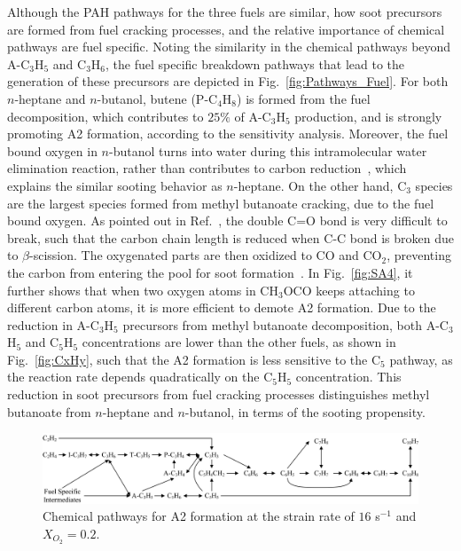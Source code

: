 \documentclass[review,3p,times]{elsarticleUS}
\begin{document}
Although the PAH pathways for the three fuels are similar, how soot precursors are formed from fuel cracking processes, and the relative importance of chemical pathways are fuel specific. Noting the similarity in the chemical pathways beyond A-C$_3$H$_5$ and C$_3$H$_6$, the fuel specific breakdown pathways that lead to the generation of these precursors are depicted in Fig.~\ref{fig:Pathways_Fuel}. For both $n$-heptane and $n$-butanol, butene (P-C$_4$H$_8$) is formed from the fuel decomposition, which contributes to $25\%$ of A-C$_3$H$_5$ production, and is strongly promoting A2 formation, according to the sensitivity analysis. Moreover, the fuel bound oxygen in $n$-butanol turns into water during this intramolecular water elimination reaction, rather than contributes to carbon reduction~\cite{mcenally05,mcenally11}, which explains the similar sooting behavior as $n$-heptane. On the other hand, C$_3$ species are the largest species formed from methyl butanoate cracking, due to the fuel bound oxygen. As pointed out in Ref.~\cite{westbrook06}, the double C=O bond is very difficult to break, such that the carbon chain length is reduced when C-C bond is broken due to $\beta$-scission. The oxygenated parts are then oxidized to CO and CO$_2$, preventing the carbon from entering the pool for soot formation~\cite{feng12,wangyl11}. In Fig.~\ref{fig:SA4}, it further shows that when two oxygen atoms in CH$_3$OCO keeps attaching to different carbon atoms, it is more efficient to demote A2 formation. Due to the reduction in A-C$_3$H$_5$ precursors from methyl butanoate decomposition, both A-C$_3$H$_5$ and C$_5$H$_5$ concentrations are lower than the other fuels, as shown in Fig.~\ref{fig:CxHy}, such that the A2 formation is less sensitive to the C$_5$ pathway, as the reaction rate depends quadratically on the C$_5$H$_5$ concentration. This reduction in soot precursors from fuel cracking processes distinguishes methyl butanoate from $n$-heptane and $n$-butanol, in terms of the sooting propensity.

\begin{figure}[h]
  \centering
  \scriptsize
  \includegraphics[width=1.0\textwidth]{Pathways-PAH.png}
  \normalsize
  \caption{Chemical pathways for A2 formation at the strain rate of $16$ s$^{-1}$ and $X_{O_2}=0.2$.}
  \label{fig:Pathways_PAH}
\end{figure}
\end{document}
